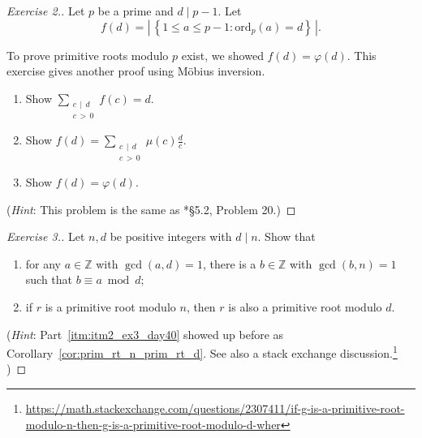 \documentclass{amsbook}
\theoremstyle{plain}
\theoremstyle{definition}
\theoremstyle{remark}
\numberwithin{equation}{chapter}
\numberwithin{figure}{chapter}
\newcommand{\Z}{\mathbb{Z}}
\newcommand*{\ord}{\text{ord}}
\begin{document}
\begin{proof}[Exercise 2.]\renewcommand*{\qedsymbol}{}
  Let $p$ be a prime and $d \mid p - 1$. Let
  \[
    f(d) = \left\vert \, \left\{ 1 \leqslant a \leqslant p-1 : \ord_p (a) = d \right\} \, \right\vert.
  \]

  To prove primitive roots modulo $p$ exist, we showed $f(d) = \varphi (d)$. This exercise gives another proof using M\"obius inversion.
  \begin{enumerate}[label=(\arabic*)]
  \item Show $\sum_{\substack{c\, \mid \, d \\c\, > \,0}} f(c) = d$.
  \item Show $f(d) = \sum_{\substack{c\, \mid \, d \\c\, > \,0}} \mu (c) \frac{d}c$.
  \item Show $f(d) = \varphi (d)$.
  \end{enumerate}

  (\emph{Hint}: This problem is the same as \cite{Strayer2001}*{\S 5.2, Problem 20}.)
\end{proof}

\begin{proof}[Exercise 3.]\renewcommand*{\qedsymbol}{}
  Let $n, d$ be positive integers with $d \mid n$.
  Show that
  \begin{enumerate}[label=(\arabic*)]
  \item for any $a \in \Z$ with $\gcd (a, d) = 1$, there is a $b \in \Z$ with $\gcd (b, n) = 1$ such that $b \equiv a \bmod d$;
  \item if $r$ is a primitive root modulo $n$, then $r$ is also a primitive root modulo $d$. \label{itm:itm2_ex3_day40}
  \end{enumerate}

  (\emph{Hint}: Part~\ref{itm:itm2_ex3_day40} showed up before as Corollary~\ref{cor:prim_rt_n_prim_rt_d}. See also a stack exchange discussion.\footnote{\url{https://math.stackexchange.com/questions/2307411/if-g-is-a-primitive-root-modulo-n-then-g-is-a-primitive-root-modulo-d-wher}} )
\end{proof}

  

%  
% 
\end{document}
